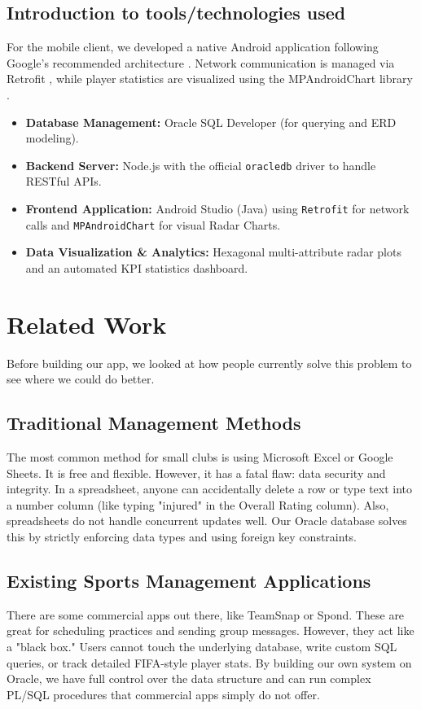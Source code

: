 \documentclass[fonts]{icst}
\begin{document}
\subsection{Introduction to tools/technologies used}
For the mobile client, we developed a native Android application following Google's recommended architecture \cite{android_arch}. Network communication is managed via Retrofit \cite{retrofit_lib}, while player statistics are visualized using the MPAndroidChart library \cite{mpandroidchart}.
\begin{itemize}
    \item \textbf{Database Management:} Oracle SQL Developer (for querying and ERD modeling).
    \item \textbf{Backend Server:} Node.js with the official \texttt{oracledb} driver to handle RESTful APIs.
    \item \textbf{Frontend Application:} Android Studio (Java) using \texttt{Retrofit} for network calls and \texttt{MPAndroidChart} for visual Radar Charts.
    \item \textbf{Data Visualization \& Analytics:} Hexagonal multi-attribute radar plots and an automated KPI statistics dashboard.
\end{itemize}

\section{Related Work}

Before building our app, we looked at how people currently solve this problem to see where we could do better.

\subsection{Traditional Management Methods}
The most common method for small clubs is using Microsoft Excel or Google Sheets. It is free and flexible. However, it has a fatal flaw: data security and integrity. In a spreadsheet, anyone can accidentally delete a row or type text into a number column (like typing "injured" in the Overall Rating column). Also, spreadsheets do not handle concurrent updates well. Our Oracle database solves this by strictly enforcing data types and using foreign key constraints.

\subsection{Existing Sports Management Applications}
There are some commercial apps out there, like TeamSnap or Spond. These are great for scheduling practices and sending group messages. However, they act like a "black box." Users cannot touch the underlying database, write custom SQL queries, or track detailed FIFA-style player stats. By building our own system on Oracle, we have full control over the data structure and can run complex PL/SQL procedures that commercial apps simply do not offer.
\end{document}
